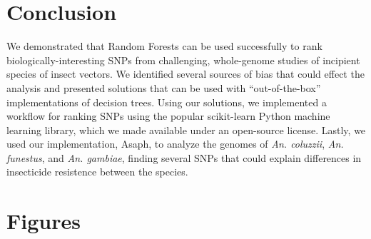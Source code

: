 \section{Conclusion}
We demonstrated that Random Forests can be used successfully to rank biologically-interesting SNPs from challenging, whole-genome studies of incipient species of insect vectors.  We identified several sources of bias that could effect the analysis and presented solutions that can be used with ``out-of-the-box'' implementations of decision trees.  Using our solutions, we implemented a workflow for ranking SNPs using the popular scikit-learn Python machine learning library, which we made available under an open-source license.  Lastly, we used our implementation, Asaph, to analyze the genomes of \emph{An. coluzzii}, \emph{An. funestus}, and \emph{An. gambiae}, finding several SNPs that could explain differences in insecticide resistence between the species.

\section{Figures}


